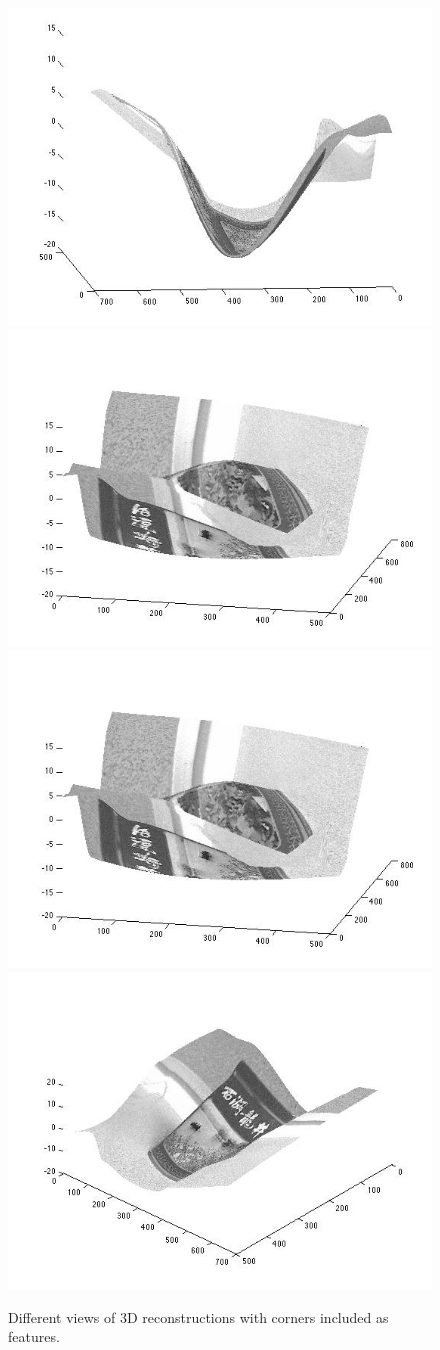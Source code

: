 \begin{figure}[H]
\begin{center}
\includegraphics[width=0.45\linewidth]{figures/pic1.jpg}
\includegraphics[width=0.45\linewidth]{figures/pic2.jpg}
\includegraphics[width=0.45\linewidth]{figures/pic3.jpg}
\includegraphics[width=0.45\linewidth]{figures/pic4.jpg}
\end{center}
\caption{Different views of 3D reconstructions with corners included as features.}
\label{zhang_reconstructed}
\end{figure}

